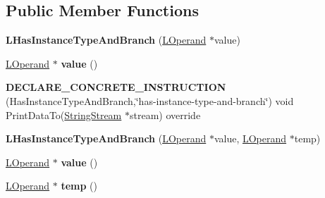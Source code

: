 \subsection*{Public Member Functions}
\begin{DoxyCompactItemize}
\item 
{\bfseries L\+Has\+Instance\+Type\+And\+Branch} (\hyperlink{classv8_1_1internal_1_1_l_operand}{L\+Operand} $\ast$value)\hypertarget{classv8_1_1internal_1_1_l_has_instance_type_and_branch_aa3a1c79111e30f9b59c15e5d022becdf}{}\label{classv8_1_1internal_1_1_l_has_instance_type_and_branch_aa3a1c79111e30f9b59c15e5d022becdf}

\item 
\hyperlink{classv8_1_1internal_1_1_l_operand}{L\+Operand} $\ast$ {\bfseries value} ()\hypertarget{classv8_1_1internal_1_1_l_has_instance_type_and_branch_a33c5f4ece667b3cc856cdba5e0ffa217}{}\label{classv8_1_1internal_1_1_l_has_instance_type_and_branch_a33c5f4ece667b3cc856cdba5e0ffa217}

\item 
{\bfseries D\+E\+C\+L\+A\+R\+E\+\_\+\+C\+O\+N\+C\+R\+E\+T\+E\+\_\+\+I\+N\+S\+T\+R\+U\+C\+T\+I\+ON} (Has\+Instance\+Type\+And\+Branch,\char`\"{}has-\/instance-\/type-\/and-\/branch\char`\"{}) void Print\+Data\+To(\hyperlink{classv8_1_1internal_1_1_string_stream}{String\+Stream} $\ast$stream) override\hypertarget{classv8_1_1internal_1_1_l_has_instance_type_and_branch_a3d0add74c6215d7b2c0629955bf970a3}{}\label{classv8_1_1internal_1_1_l_has_instance_type_and_branch_a3d0add74c6215d7b2c0629955bf970a3}

\item 
{\bfseries L\+Has\+Instance\+Type\+And\+Branch} (\hyperlink{classv8_1_1internal_1_1_l_operand}{L\+Operand} $\ast$value, \hyperlink{classv8_1_1internal_1_1_l_operand}{L\+Operand} $\ast$temp)\hypertarget{classv8_1_1internal_1_1_l_has_instance_type_and_branch_a724bc7736ff63c67353a3b18169626c5}{}\label{classv8_1_1internal_1_1_l_has_instance_type_and_branch_a724bc7736ff63c67353a3b18169626c5}

\item 
\hyperlink{classv8_1_1internal_1_1_l_operand}{L\+Operand} $\ast$ {\bfseries value} ()\hypertarget{classv8_1_1internal_1_1_l_has_instance_type_and_branch_a33c5f4ece667b3cc856cdba5e0ffa217}{}\label{classv8_1_1internal_1_1_l_has_instance_type_and_branch_a33c5f4ece667b3cc856cdba5e0ffa217}

\item 
\hyperlink{classv8_1_1internal_1_1_l_operand}{L\+Operand} $\ast$ {\bfseries temp} ()\hypertarget{classv8_1_1internal_1_1_l_has_instance_type_and_branch_a8cdfd4f289c9986c7e237c421380072f}{}\label{classv8_1_1internal_1_1_l_has_instance_type_and_branch_a8cdfd4f289c9986c7e237c421380072f}


\end{DoxyCompactItemize}
